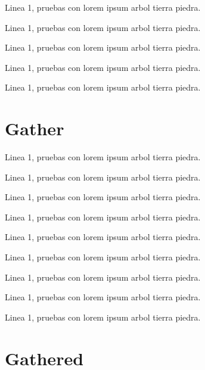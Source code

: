 Linea 1, pruebas con lorem ipsum arbol tierra piedra.


Linea 1, pruebas con lorem ipsum arbol tierra piedra.


Linea 1, pruebas con lorem ipsum arbol tierra piedra.


Linea 1, pruebas con lorem ipsum arbol tierra piedra.


Linea 1, pruebas con lorem ipsum arbol tierra piedra.

\newpage
\section{Gather}

Linea 1, pruebas con lorem ipsum arbol tierra piedra.


Linea 1, pruebas con lorem ipsum arbol tierra piedra.


Linea 1, pruebas con lorem ipsum arbol tierra piedra.

\insertgather[\label{gather1}]{arg2}

Linea 1, pruebas con lorem ipsum arbol tierra piedra.


Linea 1, pruebas con lorem ipsum arbol tierra piedra.


Linea 1, pruebas con lorem ipsum arbol tierra piedra.


Linea 1, pruebas con lorem ipsum arbol tierra piedra.

\insertgathercaptioned[\label{gathe3}]{arg2}{}

Linea 1, pruebas con lorem ipsum arbol tierra piedra.


Linea 1, pruebas con lorem ipsum arbol tierra piedra.

\newpage
\section{Gathered}

